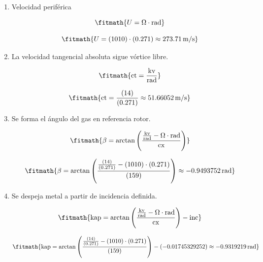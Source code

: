 \begin{enumerate}

\item Velocidad periférica

\[\fitmath{U=\Omega\cdot \mathrm{rad}}\]

\[\fitmath{U=(1010)\cdot (0.271)\approx 273.71\,\mathrm{m/s}}\]

\item La velocidad tangencial absoluta sigue vórtice libre.

\[\fitmath{\mathrm{ct}=\frac{\mathrm{kv}}{\mathrm{rad}}}\]

\[\fitmath{\mathrm{ct}=\frac{(14)}{(0.271)}\approx 51.66052\,\mathrm{m/s}}\]

\item Se forma el ángulo del gas en referencia rotor.

\[\fitmath{\beta=\arctan\left(\frac{\frac{\mathrm{kv}}{\mathrm{rad}}-\Omega\cdot \mathrm{rad}}{\mathrm{cx}}\right)}\]

\[\fitmath{\beta=\arctan\left(\frac{\frac{(14)}{(0.271)}-(1010)\cdot (0.271)}{(159)}\right)\approx -0.9493752\,\mathrm{rad}}\]

\item Se despeja metal a partir de incidencia definida.

\[\fitmath{\mathrm{kap}=\arctan\left(\frac{\frac{\mathrm{kv}}{\mathrm{rad}}-\Omega\cdot \mathrm{rad}}{\mathrm{cx}}\right)-\mathrm{inc}}\]

\[\fitmath{\mathrm{kap}=\arctan\left(\frac{\frac{(14)}{(0.271)}-(1010)\cdot (0.271)}{(159)}\right)-(-0.01745329252)\approx -0.9319219\,\mathrm{rad}}\]

\end{enumerate}
